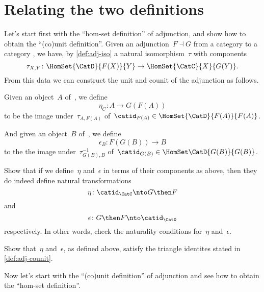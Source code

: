 \section{Relating the two definitions}
\label{relate-adj-defs}

Let's start first with the ``hom-set definition'' of adjunction, and show how to obtain the ``(co)unit definition''.
Given an adjunction~$F \dashv G$ from a category \CatC to a category \CatD, we have, by \cref{def:adj-iso} a natural isomorphism~$\tau$ with components
\begin{equation*}
  \tau_{X,Y} \colon \HomSet{\CatD}{F(X)}{Y} \to \HomSet{\CatC}{X}{G(Y)}.
\end{equation*}
From this data we can construct the unit and counit of the adjunction as follows.

Given an object~$A$ of~\CatC, we define
\begin{equation*}
  \eta_C \colon A \to G(F(A))
\end{equation*}
to be the image under~$\tau_{A, F(A)}$ of~$\catid_{F(A)} \in \HomSet{\CatD}{F (A)}{F(A)}$.

And given an object~$B$ of~\CatD, we define
\begin{equation*}
  \epsilon_B \colon F(G(B)) \to B
\end{equation*}
to the the image under~$\tau_{G(B), B}^{-1}$ of~$\catid_{G(B)} \in \HomSet\CatD{G(B)}{G(B)}$.

\begin{exercise}
  Show that if we define~$\eta$ and~$\epsilon$ in terms of their components as above, then they do indeed define natural transformations
  \begin{equation*}
    \eta\colon \catid_{\CatC} \nto G\then F
  \end{equation*}
  and
  \begin{equation*}
    \epsilon\colon G \then F \nto \catid_{\CatD}
  \end{equation*}
  respectively. In other words, check the naturality conditions for~$\eta$ and~$\epsilon$.
\end{exercise}

\begin{exercise}
  Show that~$\eta$ and~$\epsilon$, as defined above, satisfy the triangle identites stated in \cref{def:adj-counit}.
\end{exercise}

Now let's start with the ``(co)unit definition'' of adjunction and see how to obtain the ``hom-set definition''.

